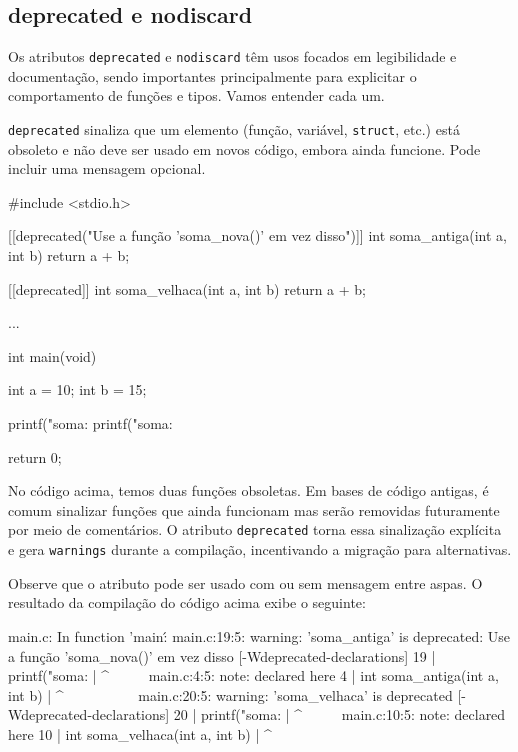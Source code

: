 \subsection{deprecated e nodiscard}

Os atributos \texttt{deprecated} e \texttt{nodiscard} têm usos focados 
em legibilidade e documentação, sendo importantes principalmente para explicitar 
o comportamento de funções e tipos. Vamos entender cada um.

\texttt{deprecated} sinaliza que um elemento (função, variável, 
\texttt{struct}, etc.) está obsoleto e não deve ser usado em novos código, 
embora ainda funcione. Pode incluir uma mensagem opcional.

\begin{excode}
#include <stdio.h>

[[deprecated("Use a função 'soma_nova()' em vez disso")]]
int soma_antiga(int a, int b)
{
    return a + b;
}

[[deprecated]]
int soma_velhaca(int a, int b)
{
    return a + b;
}

...

int main(void) {
    int a = 10;
    int b = 15;

    printf("soma: %
    printf("soma: %

    return 0;
}
\end{excode}

No código acima, temos duas funções obsoletas. Em bases de código antigas, é 
comum sinalizar funções que ainda funcionam mas serão removidas futuramente por 
meio de comentários. O atributo \texttt{deprecated} torna essa sinalização 
explícita e gera \texttt{warnings} durante a compilação, incentivando a migração 
para alternativas.

Observe que o atributo pode ser usado com ou sem mensagem entre aspas. O 
resultado da compilação do código acima exibe o seguinte:

\begin{textbox}
main.c: In function 'main\':                                                                                                                                                                       
main.c:19:5: warning: 'soma_antiga' is deprecated: Use a função
    'soma_nova()' em vez disso [-Wdeprecated-declarations]
   19 |     printf("soma: %
      |     ^~~~~~
main.c:4:5: note: declared here
    4 | int soma_antiga(int a, int b)
      |     ^~~~~~~~~~~
main.c:20:5: warning: 'soma_velhaca' is deprecated
    [-Wdeprecated-declarations]
   20 |     printf("soma: %
      |     ^~~~~~
main.c:10:5: note: declared here                                                                                                                                                                  
   10 | int soma_velhaca(int a, int b)
      |     ^~~~~~~~~~~~
\end{textbox}

